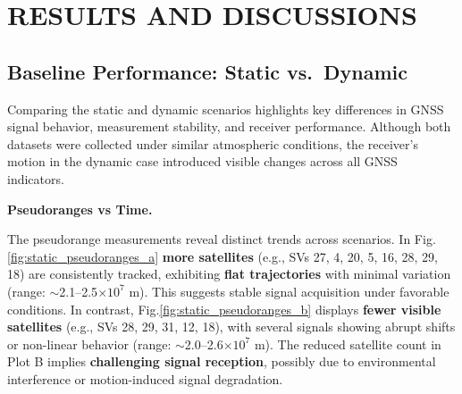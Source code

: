 
\section{RESULTS AND DISCUSSIONS} \label{sec:results}

    \subsection{Baseline Performance: Static vs.\ Dynamic}

        Comparing the static and dynamic scenarios highlights key differences in GNSS signal behavior, measurement stability, and receiver performance. 
        Although both datasets were collected under similar atmospheric conditions, the receiver's motion in the dynamic case introduced visible changes across all GNSS indicators.
    
        \vspace{0.5em}
        \noindent \textbf{Pseudoranges vs Time.}
        
        \noindent The pseudorange measurements reveal distinct trends across scenarios. 
        In Fig. \ref{fig:static_pseudoranges_a} \textbf{more satellites} (e.g., SVs 27, 4, 20, 5, 16, 28, 29, 18) are consistently tracked, exhibiting \textbf{flat trajectories} with minimal variation (range: $\sim$2.1--2.5$\times 10^7$ m). 
        This suggests stable signal acquisition under favorable conditions. In contrast, Fig.\ref{fig:static_pseudoranges_b} displays \textbf{fewer visible satellites} (e.g., SVs 28, 29, 31, 12, 18), with several signals showing abrupt shifts or non-linear behavior (range: $\sim$2.0--2.6$\times 10^7$ m). 
        The reduced satellite count in Plot B implies \textbf{challenging signal reception}, possibly due to environmental interference or motion-induced signal degradation.

